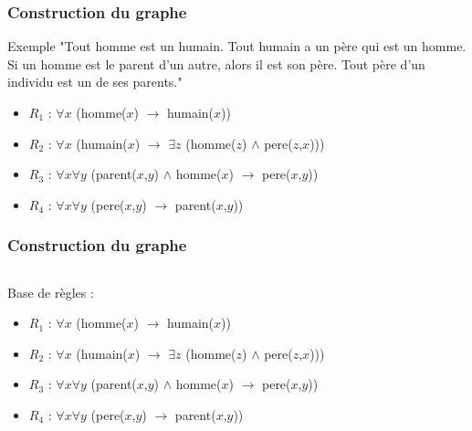 \begin{frame}
	\frametitle{Construction du graphe}
	\begin{exampleblock}{Exemple}
		"Tout homme est un humain.
		Tout humain a un père qui est un homme.
		Si un homme est le parent d'un autre, alors il est son père.
		Tout père d'un individu est un de ses parents."

		\begin{itemize}
			\item $R_1$ : $\forall x$ (homme($x$) $\rightarrow$ humain($x$))
			\item $R_2$ : $\forall x$ (humain($x$) $\rightarrow$ $\exists z$ (homme($z$)
			$\wedge$ pere($z$,$x$)))
			\item $R_3$ : $\forall x \forall y$ (parent($x$,$y$) $\wedge$ homme($x$)
			$\rightarrow$ pere($x$,$y$))
			\item $R_4$ : $\forall x \forall y$ (pere($x$,$y$) $\rightarrow$
			parent($x$,$y$))
		\end{itemize}
	\end{exampleblock}
\end{frame}

\begin{frame}
	\frametitle{Construction du graphe}
	\begin{columns}
	\begin{column}{0.55\linewidth}
		Base de règles :
		\begin{itemize}
			\item $R_1$ : $\forall x$ (homme($x$) $\rightarrow$ humain($x$))
			\item $R_2$ : $\forall x$ (humain($x$) $\rightarrow$ $\exists z$ (homme($z$)
			$\wedge$ pere($z$,$x$)))
			\item $R_3$ : $\forall x \forall y$ (parent($x$,$y$) $\wedge$ homme($x$)
			$\rightarrow$ pere($x$,$y$))
			\item $R_4$ : $\forall x \forall y$ (pere($x$,$y$) $\rightarrow$
			parent($x$,$y$))
		\end{itemize}
		\vfill
	\end{column}
	\vline
	\hfill
	\begin{column}{0.35\linewidth}
		\begin{figure}
		\end{figure}
	\end{column}
	\end{columns}
\end{frame}

